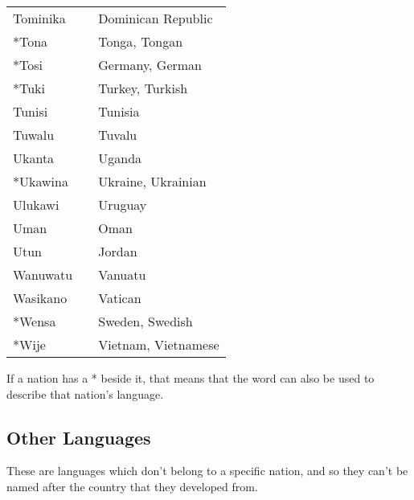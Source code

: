 \begin{supertabular}{p{4,5cm}|ll}
    Tominika                   &  & Dominican Republic              \\
    *Tona                      &  & Tonga, Tongan                   \\
    *Tosi                      &  & Germany, German                 \\
    *Tuki                      &  & Turkey, Turkish                 \\
    Tunisi                     &  & Tunisia                         \\
    Tuwalu                     &  & Tuvalu                          \\
    Ukanta                     &  & Uganda                          \\
    *Ukawina                   &  & Ukraine, Ukrainian              \\
    Ulukawi                    &  & Uruguay                         \\
    Uman                       &  & Oman                            \\
    Utun                       &  & Jordan                          \\
    Wanuwatu                   &  & Vanuatu                         \\
    Wasikano                   &  & Vatican                         \\
    *Wensa                     &  & Sweden, Swedish                 \\
    *Wije                      &  & Vietnam, Vietnamese             \\
\end{supertabular}

If a nation has a * beside it, that means that the word can also be used to describe that nation's language.

\newpage

\subsection*{Other Languages}

These are languages which don't belong to a specific nation, and so they can't be named after the country that they developed from.

